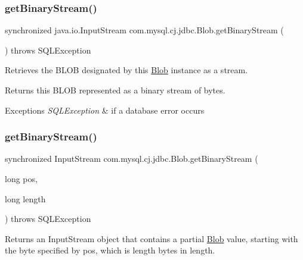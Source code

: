 \subsubsection{\texorpdfstring{get\+Binary\+Stream()}{getBinaryStream()}\hspace{0.1cm}{\footnotesize\ttfamily [1/2]}}
{\footnotesize\ttfamily synchronized java.\+io.\+Input\+Stream com.\+mysql.\+cj.\+jdbc.\+Blob.\+get\+Binary\+Stream (\begin{DoxyParamCaption}{ }\end{DoxyParamCaption}) throws S\+Q\+L\+Exception}

Retrieves the B\+L\+OB designated by this \mbox{\hyperlink{classcom_1_1mysql_1_1cj_1_1jdbc_1_1_blob}{Blob}} instance as a stream.

\begin{DoxyReturn}{Returns}
this B\+L\+OB represented as a binary stream of bytes.
\end{DoxyReturn}

\begin{DoxyExceptions}{Exceptions}
{\em S\+Q\+L\+Exception} & if a database error occurs \\
\hline
\end{DoxyExceptions}
\mbox{\label{classcom_1_1mysql_1_1cj_1_1jdbc_1_1_blob_a000b7ade4e7fea17e5d40085a2a9dabe}} 
\subsubsection{\texorpdfstring{get\+Binary\+Stream()}{getBinaryStream()}\hspace{0.1cm}{\footnotesize\ttfamily [2/2]}}
{\footnotesize\ttfamily synchronized Input\+Stream com.\+mysql.\+cj.\+jdbc.\+Blob.\+get\+Binary\+Stream (\begin{DoxyParamCaption}\item[{long}]{pos,  }\item[{long}]{length }\end{DoxyParamCaption}) throws S\+Q\+L\+Exception}

Returns an {\ttfamily Input\+Stream} object that contains a partial {\ttfamily \mbox{\hyperlink{classcom_1_1mysql_1_1cj_1_1jdbc_1_1_blob}{Blob}}} value, starting with the byte specified by pos, which is length bytes in length.


